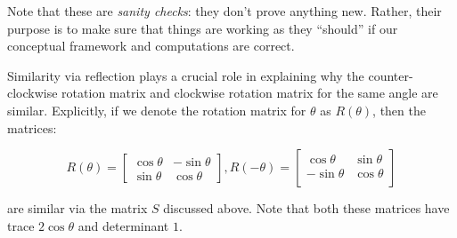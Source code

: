 \documentclass[10pt]{amsart}
\begin{document}
Note that these are {\em sanity checks}: they don't prove anything
new. Rather, their purpose is to make sure that things are working as
they ``should'' if our conceptual framework and computations are
correct.

Similarity via reflection plays a crucial role in explaining why the
counter-clockwise rotation matrix and clockwise rotation matrix for
the same angle are similar. Explicitly, if we denote the rotation
matrix for $\theta$ as $R(\theta)$, then the matrices:

$$R(\theta) = \left[\begin{matrix} \cos \theta & -\sin \theta \\ \sin \theta & \cos \theta \end{matrix}\right], R(-\theta) = \left[\begin{matrix} \cos \theta & \sin \theta \\ - \sin \theta & \cos \theta \\\end{matrix}\right]$$

are similar via the matrix $S$ discussed above. Note that both these
matrices have trace $2 \cos \theta$ and determinant $1$.
\end{document}
